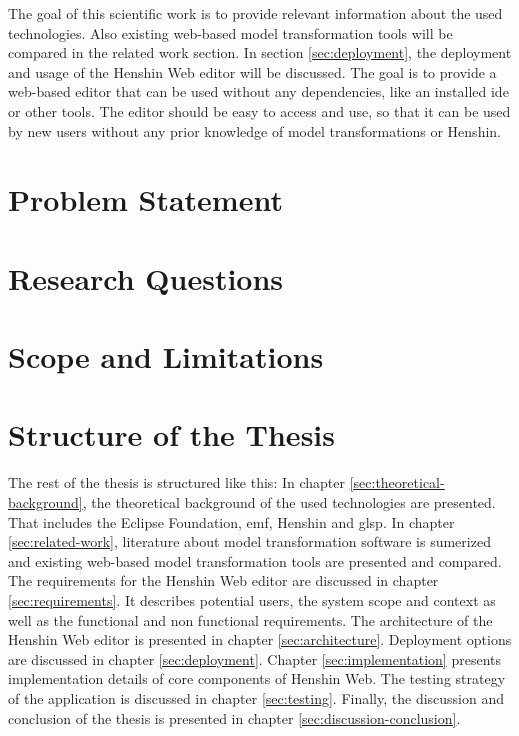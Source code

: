 The goal of this scientific work is to provide relevant information about the used technologies. Also existing web-based model transformation tools will be compared in the related work section. In section \ref{sec:deployment}, the deployment and usage of the Henshin Web editor will be discussed. The goal is to provide a web-based editor that can be used without any dependencies, like an installed \acs{ide} or other tools. The editor should be easy to access and use, so that it can be used by new users without any prior knowledge of model transformations or Henshin.

\section{Problem Statement}
\label{subsec:problem-statement}

\section{Research Questions}
\label{subsec:research-questions}

\section{Scope and Limitations}
\label{subsec:scope-limitations}

\section{Structure of the Thesis}
\label{subsec:structure-thesis}

The rest of the thesis is structured like this: In chapter \ref{sec:theoretical-background}, the theoretical background of the used technologies are presented. That includes the Eclipse Foundation, \ac{emf}, Henshin and \ac{glsp}. In chapter \ref{sec:related-work}, literature about model transformation software is sumerized and existing web-based model transformation tools are presented and compared. The requirements for the Henshin Web editor are discussed in chapter \ref{sec:requirements}. It describes potential users, the system scope and context as well as the functional and non functional requirements. The architecture of the Henshin Web editor is presented in chapter \ref{sec:architecture}. Deployment options are discussed in chapter \ref{sec:deployment}. Chapter \ref{sec:implementation} presents implementation details of core components of Henshin Web. The testing strategy of the application is discussed in chapter \ref{sec:testing}. Finally, the discussion and conclusion of the thesis is presented in chapter \ref{sec:discussion-conclusion}.